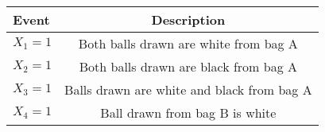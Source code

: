\begin{tabular}{|l|c|}

\hline
\textbf{Event} & \textbf{Description} \\
\hline
$X_1 = 1$ &  Both balls drawn are white from bag A \\
\hline
$X_2 = 1$ &  Both balls drawn are black from bag A \\
\hline
$X_3 = 1$ &  Balls drawn are white and black from bag A \\
\hline
$X_4 = 1$ &  Ball drawn from bag B is white \\
\hline
\end{tabular}
